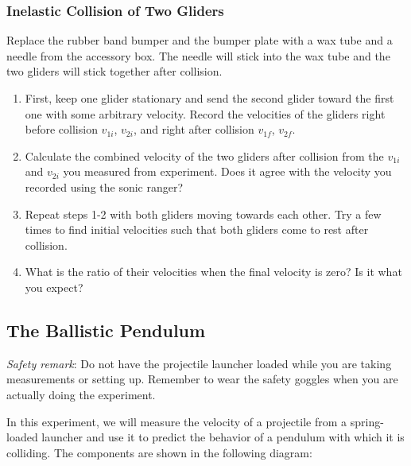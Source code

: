 \subsubsection{Inelastic Collision of Two Gliders}

Replace the rubber band bumper and the bumper plate with a wax tube and a needle from the accessory box. The needle will stick into the wax tube and the two gliders will stick together after collision.
\begin{enumerate}
\item First, keep one glider stationary and send the second glider toward the first one with some arbitrary velocity. Record the velocities of the gliders right before collision $v_{1i}$, $v_{2i}$, and right after collision $v_{1f}$, $v_{2f}$.
    \item Calculate the combined velocity of the two gliders after collision from the $v_{1i}$ and $v_{2i}$ you measured from experiment. Does it agree with the velocity you recorded using the sonic ranger?
    \item Repeat  steps 1-2 with both gliders moving towards each other. Try a few times to find initial velocities such that both gliders come to rest after collision.
\item What is the ratio of their velocities when the final velocity is zero? Is it what you expect?
\end{enumerate}

\subsection{The Ballistic Pendulum}
\emph{Safety remark}: Do not have the projectile launcher loaded while you are taking measurements or setting up. Remember to wear the safety goggles when you are actually doing the experiment.\myskip

In this experiment, we will measure the velocity of a projectile from a spring-loaded launcher and use it to predict the behavior of a pendulum with which it is colliding. The components are shown in the following diagram:

